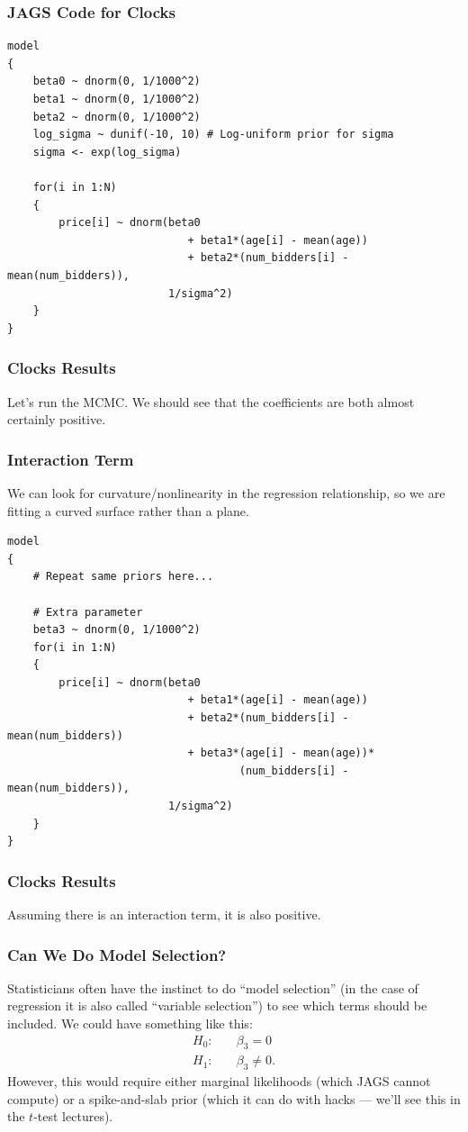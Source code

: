 \documentclass{beamer}
\begin{document}
\begin{frame}[fragile]
\frametitle{JAGS Code for Clocks}
\tiny

\begin{verbatim}
model
{
    beta0 ~ dnorm(0, 1/1000^2)
    beta1 ~ dnorm(0, 1/1000^2)
    beta2 ~ dnorm(0, 1/1000^2)
    log_sigma ~ dunif(-10, 10) # Log-uniform prior for sigma
    sigma <- exp(log_sigma)

    for(i in 1:N)
    {
        price[i] ~ dnorm(beta0
                            + beta1*(age[i] - mean(age))
                            + beta2*(num_bidders[i] - mean(num_bidders)),
                         1/sigma^2)
    }
}
\end{verbatim}

\end{frame}


\begin{frame}[fragile]
\frametitle{Clocks Results}
Let's run the MCMC. We should see that the coefficients are both
almost certainly positive.

\end{frame}


\begin{frame}[fragile]
\frametitle{Interaction Term}
We can look for curvature/nonlinearity in the regression relationship,
so we are fitting a curved surface rather than a plane.
\tiny
\begin{verbatim}
model
{
    # Repeat same priors here...

    # Extra parameter
    beta3 ~ dnorm(0, 1/1000^2)
    for(i in 1:N)
    {
        price[i] ~ dnorm(beta0
                            + beta1*(age[i] - mean(age))
                            + beta2*(num_bidders[i] - mean(num_bidders))
                            + beta3*(age[i] - mean(age))*
                                    (num_bidders[i] - mean(num_bidders)),
                         1/sigma^2)
    }
}
\end{verbatim}

\end{frame}


\begin{frame}[fragile]
\frametitle{Clocks Results}
Assuming there is an interaction term, it is also positive.

\end{frame}



\begin{frame}[fragile]
\frametitle{Can We Do Model Selection?}
Statisticians often have the instinct to do ``model selection'' (in the case
of regression it is also called ``variable selection'') to see which terms
should be included. We could have something like this:
\begin{align}
H_0:\quad& \beta_3 = 0 \\
H_1:\quad& \beta_3 \neq 0.
\end{align}
\pause
However, this would require either marginal likelihoods (which JAGS cannot
compute) or a spike-and-slab prior (which it can do with hacks --- we'll
see this in the $t$-test lectures).
\end{frame}
\end{document}
